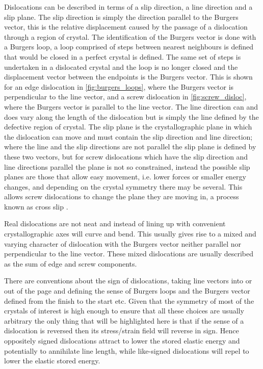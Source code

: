 Dislocations can be described in terms of a slip direction, a line direction and a slip plane. The slip direction is simply the direction parallel to the Burgers vector, this is the relative displacement caused by the passage of a dislocation through a region of crystal. The identification of the Burgers vector is done with a Burgers loop, a loop comprised of steps between nearest neighbours is defined that would be closed in a perfect crystal is defined. The same set of steps is undertaken in a dislocated crystal and the loop is no longer closed and the displacement vector between the endpoints is the Burgers vector. This is shown for an edge dislocation in \autoref{fig:burgers_loops}, where the Burgers vector is perpendicular to the line vector, and a screw dislocation in \autoref{fig:screw_disloc}, where the Burgers vector is parallel to the line vector. The line direction can and does vary along the length of the dislocation but is simply the line defined by the defective region of crystal. The slip plane is the crystallographic plane in which the dislocation can move and must contain the slip direction and line direction; where the line and the slip directions are not parallel the slip plane is defined by these two vectors, but for screw dislocations which have the slip direction and line directions parallel the plane is not so constrained, instead the possible slip planes are those that allow easy movement, i.e. lower forces or smaller energy changes, and depending on the crystal symmetry there may be several. This allows screw dislocations to change the plane they are moving in, a process known as cross slip \cite{Hirth_Lothe1982intro}.

Real dislocations are not neat and instead of lining up with convenient crystallographic axes will curve and bend. This usually gives rise to a mixed and varying character of dislocation with the Burgers vector neither parallel nor perpendicular to the line vector. These mixed dislocations are usually described as the sum of edge and screw components.

There are conventions about the sign of dislocations, taking line vectors into or out of the page and defining the sense of Burgers loops and the Burgers vector defined from the finish to the start etc. Given that the symmetry of most of the crystals of interest is high enough to ensure that all these choices are usually arbitrary the only thing that will be highlighted here is that if the sense of a dislocation is reversed then its stress/strain field will reverse in sign. Hence oppositely signed dislocations attract to lower the stored elastic energy and potentially to annihilate line length, while like-signed dislocations will repel to lower the elastic stored energy.



